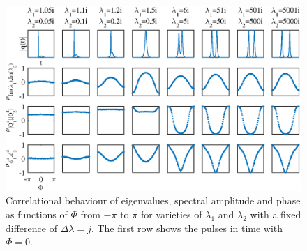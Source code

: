 \documentclass[9pt,twocolumn,twoside]{osajnl}
\begin{document}
\begin{figure}[htbp]
    \centering
    \includegraphics[width=\linewidth]{LCorrelation}
    \caption{Correlational behaviour of eigenvalues, spectral amplitude and phase as functions of $\Phi$ from $-\pi$ to $\pi$ for varieties of $\lambda_1$ and $\lambda_2$ with a fixed difference of $\Delta\lambda=j$. The first row shows the pulses in time with $\Phi=0$.}
    \label{fig:fig3}
\end{figure}
\end{document}
